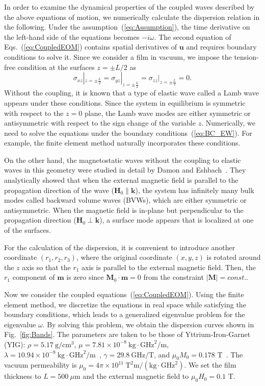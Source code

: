 \documentclass[10pt]{iopart}
\begin{document}
In order to examine the dynamical properties of the coupled waves described by the above equations of motion, we numerically calculate the dispersion relation in the following. Under the assumption~(\ref{eq:Assumption}), the time derivative on the left-hand side of the equations becomes $-i\omega$. The second equation of Eqs.~(\ref{eq:CoupledEOM}) contains spatial derivatives of $\bm{u}$ and requires boundary conditions to solve it. Since we consider a film in vacuum, we impose the tension-free condition at the surfaces $z=\pm L/2$ as
\begin{equation}
    \sigma_{xz}|_{z=\pm\frac{L}{2}}=\sigma_{yz}|_{z=\pm\frac{L}{2}}=\sigma_{zz}|_{z=\pm\frac{L}{2}}=0.\label{eq:BC_EW}
\end{equation}
Without the coupling, it is known that a type of elastic wave called a Lamb wave appears under these conditions. Since the system in equilibrium is symmetric with respect to the $z=0$ plane, the Lamb wave modes are either symmetric or antisymmetric with respect to the sign change of the variable $z$. Numerically, we need to solve the equations under the boundary conditions~(\ref{eq:BC_EW}). For example, the finite element method naturally incorporates these conditions.

On the other hand, the magnetostatic waves without the coupling to elastic waves in this geometry were studied in detail by Damon and Eshbach~\cite{damonMagnetostaticModesFerromagnet1961}. They analytically showed that when the external magnetic field is parallel to the propagation direction of the wave ($\bm{H}_0\parallel\bm{k}$), the system has infinitely many bulk modes called backward volume waves (BVWs), which are either symmetric or antisymmetric. When the magnetic field is in-plane but perpendicular to the propagation direction ($\bm{H}_0\perp\bm{k}$), a surface mode appears that is localized at one of the surfaces.

For the calculation of the dispersion, it is convenient to introduce another coordinate $(r_1,r_2,r_3)$, where the original coordinate $(x,y,z)$ is rotated around the $z$ axis so that the $r_1$ axis is parallel to the external magnetic field. Then, the $r_1$ component of $\bm{m}$ is zero since $\bm{M}_0\cdot\bm{m}=0$ from the constraint $|\bm{M}|=const.$.

Now we consider the coupled equations~(\ref{eq:CoupledEOM}). Using the finite element method, we discretize the equations in real space while satisfying the boundary conditions, which leads to a generalized eigenvalue problem for the eigenvalue $\omega$. By solving this problem, we obtain the dispersion curves shown in Fig.~\ref{fig:Bands}. The parameters are taken to be those of Yttrium-Iron-Garnet (YIG): $\rho=5.17\ \mathrm{g}/\mathrm{cm}^3$, $\mu=7.81\times10^{-8}\ \mathrm{kg}\cdot\mathrm{GHz}^2/\mathrm{m}$, $\lambda=10.94\times10^{-8}\ \mathrm{kg}\cdot\mathrm{GHz}^2/\mathrm{m}$~\cite{clarkElasticConstantsSingleCrystal1961}, $\gamma=29.8\ \mathrm{GHz}/\mathrm{T}$, and $\mu_0M_0=0.178$ T~\cite{AulockHandbookofferritematerials}. The vacuum permeability is $\mu_0=4\pi\times10^{11}\ \mathrm{T}^2\mathrm{m}/(\mathrm{kg}\cdot\mathrm{GHz}^2)$. We set the film thickness to $L=500\ \mu$m and the external magnetic field to $\mu_0H_0=0.1$ T.
\end{document}
